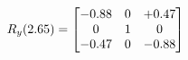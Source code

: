 \documentclass[preview]{standalone}
\begin{document}
\begin{align*}
\special{dvisvgm:raw <g id='unique000'>}R_{y}(2.65) = \begin{bmatrix}-0.88 & 0 & +0.47 \\0 & 1 & 0 \\-0.47 & 0 & -0.88\end{bmatrix}\special{dvisvgm:raw </g>}
\end{align*}
\end{document}

